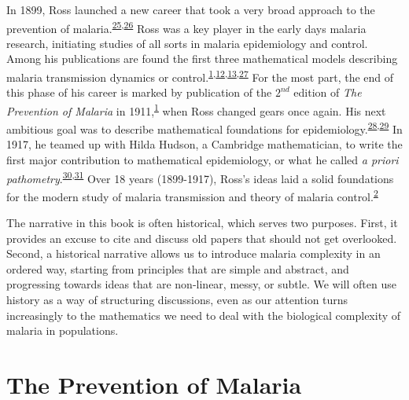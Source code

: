 \documentclass[
]{book}
\begin{document}
In 1899, Ross launched a new career that took a very broad approach to the prevention of malaria.\textsuperscript{\protect\hyperlink{ref-RossR1899ExterminationMalaria}{25},\protect\hyperlink{ref-RossR1899InauguralLecture}{26}}
Ross was a key player in the early days malaria research, initiating studies of all sorts in malaria epidemiology and control.
Among his publications are found the first three mathematical models describing malaria transmission dynamics or control.\textsuperscript{\protect\hyperlink{ref-RossR1911Book}{1},\protect\hyperlink{ref-RossR1905LogicalBasis}{12},\protect\hyperlink{ref-RossR1908}{13},\protect\hyperlink{ref-RossR1911Nature}{27}}
For the most part, the end of this phase of his career is marked by publication of the \(2^{nd}\) edition of \emph{The Prevention of Malaria} in 1911,\textsuperscript{\protect\hyperlink{ref-RossR1911Book}{1}} when Ross changed gears once again.
His next ambitious goal was to describe mathematical foundations for epidemiology.\textsuperscript{\protect\hyperlink{ref-RossR1915AprioriPathometry}{28},\protect\hyperlink{ref-RossR1916ApplicationTheory}{29}}
In 1917, he teamed up with Hilda Hudson, a Cambridge mathematician, to write the first major contribution to mathematical epidemiology, or what he called \emph{a priori pathometry}.\textsuperscript{\protect\hyperlink{ref-RossR1917AprioriPathometry2}{30},\protect\hyperlink{ref-RossR1917AprioriPathometry3}{31}}
Over 18 years (1899-1917), Ross's ideas laid a solid foundations for the modern study of malaria transmission and theory of malaria control.\textsuperscript{\protect\hyperlink{ref-SmithDL2012_RossMacdonald}{2}}

The narrative in this book is often historical, which serves two purposes.
First, it provides an excuse to cite and discuss old papers that should not get overlooked.
Second, a historical narrative allows us to introduce malaria complexity in an ordered way, starting from principles that are simple and abstract, and progressing towards ideas that are non-linear, messy, or subtle.
We will often use history as a way of structuring discussions, even as our attention turns increasingly to the mathematics we need to deal with the biological complexity of malaria in populations.

\hypertarget{the-prevention-of-malaria}{%
\section{The Prevention of Malaria}\label{the-prevention-of-malaria}}
\end{document}
